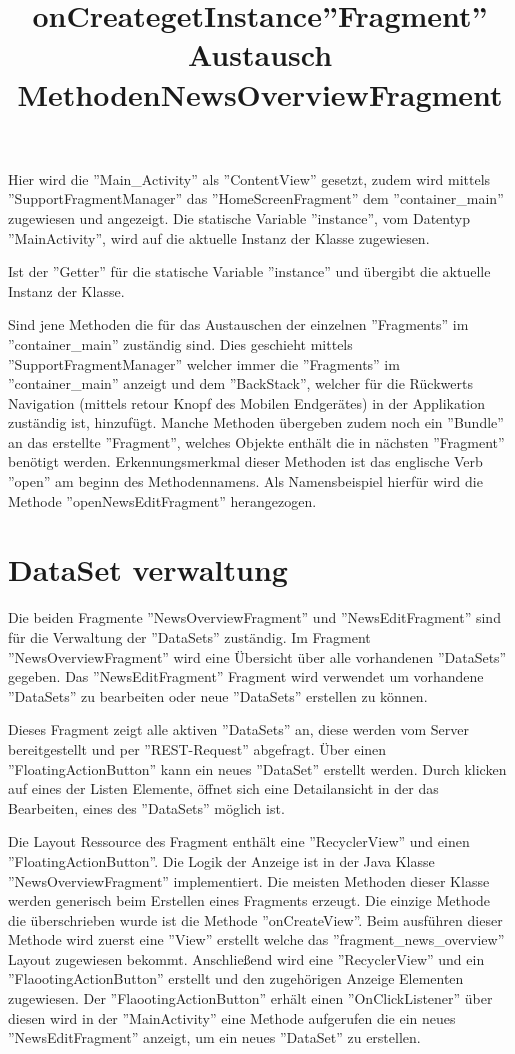 \title{onCreate}
Hier wird die ''Main\_Activity'' als ''ContentView'' gesetzt, zudem wird mittels ''SupportFragmentManager'' das ''HomeScreenFragment'' dem ''container\_main'' zugewiesen und angezeigt. Die statische Variable ''instance'', vom Datentyp ''MainActivity'', wird auf die aktuelle Instanz der Klasse zugewiesen. 
	
\title{getInstance}
 Ist der ''Getter'' für die statische Variable ''instance'' und übergibt die aktuelle Instanz der Klasse.
	
\title{''Fragment'' Austausch Methoden}
 Sind jene Methoden die für das Austauschen der einzelnen ''Fragments'' im ''container\_main'' zuständig sind. Dies geschieht mittels ''SupportFragmentManager'' welcher immer die ''Fragments'' im ''container\_main'' anzeigt und dem ''BackStack'', welcher für die Rückwerts Navigation (mittels retour Knopf des Mobilen Endgerätes) in der Applikation zuständig ist,  hinzufügt. Manche Methoden übergeben zudem noch ein ''Bundle'' an das erstellte ''Fragment'', welches Objekte enthält die in nächsten ''Fragment'' benötigt werden. Erkennungsmerkmal dieser Methoden ist das englische Verb ''open'' am beginn des Methodennamens. Als Namensbeispiel hierfür wird die Methode ''openNewsEditFragment'' herangezogen.





\section{DataSet verwaltung}
Die beiden Fragmente  ''NewsOverviewFragment'' und ''NewsEditFragment'' sind für die Verwaltung der ''DataSets'' zuständig. Im Fragment ''NewsOverviewFragment'' wird eine Übersicht über alle vorhandenen ''DataSets'' gegeben. Das ''NewsEditFragment'' Fragment wird verwendet um vorhandene ''DataSets'' zu bearbeiten oder neue ''DataSets'' erstellen zu können. 


\title{NewsOverviewFragment}

Dieses Fragment zeigt alle aktiven ''DataSets'' an, diese werden vom Server bereitgestellt und per ''REST-Request'' abgefragt. Über einen ''FloatingActionButton'' kann ein neues ''DataSet'' erstellt werden. Durch klicken auf eines der Listen Elemente, öffnet sich eine Detailansicht in der das Bearbeiten, eines des ''DataSets'' möglich ist.

Die Layout Ressource des Fragment enthält eine ''RecyclerView'' und einen ''FloatingActionButton''. Die Logik der Anzeige ist in der Java Klasse ''NewsOverviewFragment'' implementiert. Die meisten Methoden dieser Klasse werden generisch beim Erstellen eines Fragments erzeugt. Die einzige Methode die überschrieben wurde ist die Methode ''onCreateView''. Beim ausführen dieser Methode wird zuerst eine ''View'' erstellt welche das ''fragment\_news\_overview'' Layout zugewiesen bekommt. Anschließend wird eine ''RecyclerView'' und ein ''FlaootingActionButton'' erstellt und den zugehörigen Anzeige Elementen zugewiesen. Der ''FlaootingActionButton'' erhält einen ''OnClickListener'' über diesen wird in der ''MainActivity'' eine Methode aufgerufen die ein neues ''NewsEditFragment'' anzeigt, um ein neues ''DataSet'' zu erstellen. 


